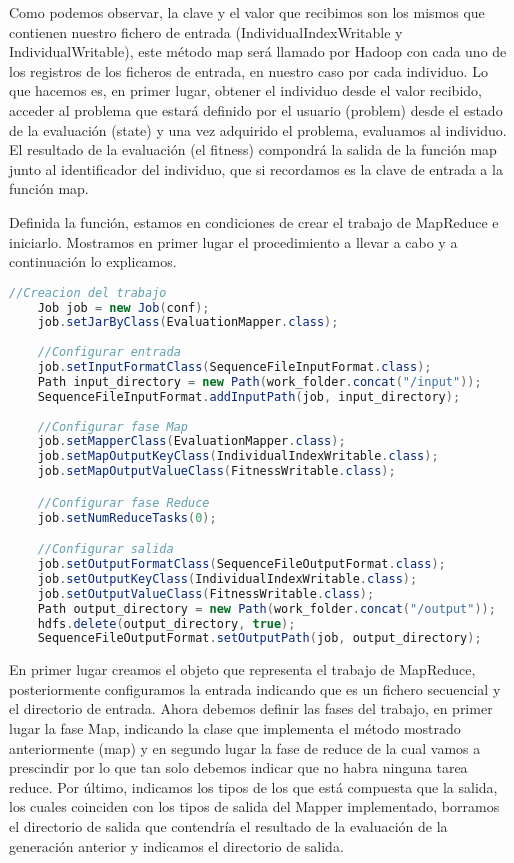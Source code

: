 Como podemos observar, la clave y el valor que recibimos son los mismos que contienen nuestro fichero de entrada (IndividualIndexWritable y IndividualWritable), este método map ser\'a llamado por Hadoop con cada uno de los registros de los ficheros de entrada, en nuestro caso por cada individuo. Lo que hacemos es, en primer lugar, obtener el individuo desde el valor recibido, acceder al problema que estará definido por el usuario (problem) desde el estado de la evaluación (state) y una vez adquirido el problema, evaluamos al individuo. El resultado de la evaluación (el fitness) compondrá la salida de la función map junto al identificador del individuo, que si recordamos es la clave de entrada a la función map.

Definida la función, estamos en condiciones de crear el trabajo de MapReduce e iniciarlo. Mostramos en primer lugar el procedimiento a llevar a cabo y a continuación lo explicamos.

\begin{lstlisting}[language=Java]
	//Creacion del trabajo
	Job job = new Job(conf);
	job.setJarByClass(EvaluationMapper.class);
	
	//Configurar entrada
	job.setInputFormatClass(SequenceFileInputFormat.class);
	Path input_directory = new Path(work_folder.concat("/input"));
	SequenceFileInputFormat.addInputPath(job, input_directory);
	
	//Configurar fase Map
	job.setMapperClass(EvaluationMapper.class);
	job.setMapOutputKeyClass(IndividualIndexWritable.class);
	job.setMapOutputValueClass(FitnessWritable.class);

	//Configurar fase Reduce
	job.setNumReduceTasks(0);

	//Configurar salida
	job.setOutputFormatClass(SequenceFileOutputFormat.class);
	job.setOutputKeyClass(IndividualIndexWritable.class);
	job.setOutputValueClass(FitnessWritable.class);
	Path output_directory = new Path(work_folder.concat("/output"));
	hdfs.delete(output_directory, true);
	SequenceFileOutputFormat.setOutputPath(job, output_directory);
\end{lstlisting}

En primer lugar creamos el objeto que representa el trabajo de MapReduce, posteriormente configuramos la entrada indicando que es un fichero secuencial y el directorio de entrada. Ahora debemos definir las fases del trabajo, en primer lugar la fase Map, indicando la clase que implementa el método mostrado anteriormente (map) y en segundo lugar la fase de reduce de la cual vamos a prescindir por lo que tan solo debemos indicar que no habra ninguna tarea reduce. Por \'ultimo, indicamos los tipos de los que est\'a compuesta que la salida, los cuales coinciden con los tipos de salida del Mapper implementado, borramos el directorio de salida que contendría el resultado de la evaluación de la generación anterior y indicamos el directorio de salida.

